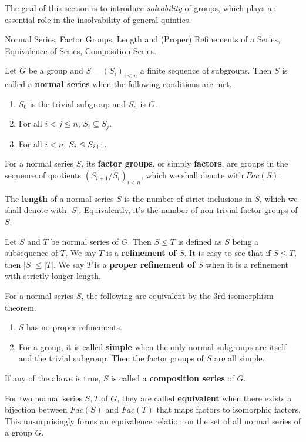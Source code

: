 \documentclass[../../book.tex]{subfiles}
\begin{document}
The goal of this section is to introduce \emph{solvability} of groups,
which plays an essential role in the insolvability of general quintics. 

\begin{dfn} Normal Series, Factor Groups, Length 
and (Proper) Refinements of a Series, Equivalence of Series, Composition Series.
    
    Let $G$ be a group and 
    $S = (S_i)_{i\leq n}$ a finite sequence of subgroups.
    Then $S$ is called a \textbf{normal series} when the following conditions are met.
    \begin{enumerate}
        \item $S_0$ is the trivial subgroup and $S_n$ is $G$. 
        \item For all $i < j \leq n$, $S_i \subseteq S_j$. 
        \item For all $i < n$, $S_i \trianglelefteq S_{i+1}$.
    \end{enumerate}
    For a normal series $S$, 
    its \textbf{factor groups}, or simply \textbf{factors},
    are groups in the sequence of quotients $(S_{i+1}/S_i)_{i<n}$,
    which we shall denote with $Fac(S)$.
    
    The \textbf{length} of a normal series $S$ is
    the number of strict inclusions in $S$, which we shall denote with $|S|$.
    Equivalently, it's the number of non-trivial factor groups of $S$. 
    
    Let $S$ and $T$ be normal series of $G$. 
    Then $S \leq T$ is defined as $S$ being a subsequence of $T$. 
    We say $T$ is a \textbf{refinement of $S$}.
    It is easy to see that if $S \leq T$, then $|S| \leq |T|$.
    We say $T$ is a \textbf{proper refinement of $S$}
    when it is a refinement with strictly longer length. 
    
    For a normal series $S$, 
    the following are equivalent by the 3rd isomorphism theorem.
    \begin{enumerate}
        \item $S$ has no proper refinements.
        \item For a group, it is called \textbf{simple} when
        the only normal subgroups are itself and the trivial subgroup.
        Then the factor groups of $S$ are all simple. 
    \end{enumerate}
    If any of the above is true, $S$ is called a \textbf{composition series} of $G$. 
    
    For two normal series $S, T$ of $G$, 
    they are called \textbf{equivalent} when 
    there exists a bijection between $Fac(S)$ and $Fac(T)$
    that maps factors to isomorphic factors. 
    This unsurprisingly forms an equivalence relation 
    on the set of all normal series of a group $G$. 
    
\end{dfn}
\end{document}
